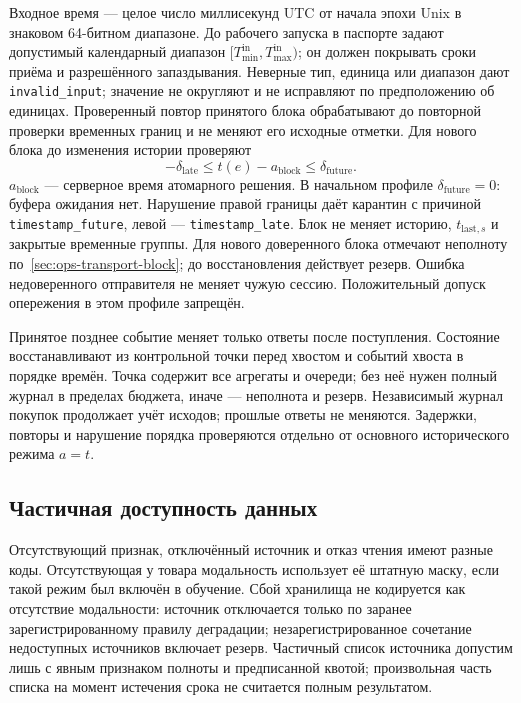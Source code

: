 \documentclass[12pt,a4paper]{article}
\newcommand{\code}[1]{{\ttfamily\small\nolinkurl{#1}}}
\theoremstyle{plainru}
\begin{document}
Входное время --- целое число миллисекунд UTC от начала эпохи Unix
в знаковом 64-битном диапазоне. До рабочего запуска в паспорте задают
допустимый календарный диапазон $[T_{\min}^{\mathrm{in}},T_{\max}^{\mathrm{in}})$;
он должен покрывать сроки приёма и разрешённого запаздывания.
Неверные тип, единица или диапазон дают \code{invalid_input};
значение не округляют и не исправляют по предположению об единицах.
Проверенный повтор принятого блока обрабатывают до повторной проверки
временных границ и не меняют его исходные отметки.
Для нового блока до изменения истории проверяют
\begin{equation}\label{eq:ops-event-time-window}
-\delta_{\mathrm{late}}\le t(e)-a_{\mathrm{block}}
\le\delta_{\mathrm{future}}.
\end{equation}
$a_{\mathrm{block}}$ --- серверное время атомарного решения.
В начальном профиле $\delta_{\mathrm{future}}=0$: буфера ожидания нет.
Нарушение правой границы даёт карантин с причиной \code{timestamp_future},
левой --- \code{timestamp_late}. Блок не меняет историю,
$t_{\mathrm{last},s}$ и закрытые временные группы. Для нового доверенного
блока отмечают неполноту по~\ref{sec:ops-transport-block};
до восстановления действует резерв. Ошибка недоверенного отправителя
не меняет чужую сессию. Положительный допуск опережения в этом профиле запрещён.

Принятое позднее событие меняет только ответы после поступления.
Состояние восстанавливают из контрольной точки перед хвостом
и событий хвоста в порядке времён. Точка содержит все агрегаты и очереди;
без неё нужен полный журнал в пределах бюджета, иначе --- неполнота и резерв.
Независимый журнал покупок продолжает учёт исходов; прошлые ответы не меняются.
Задержки, повторы и нарушение порядка проверяются отдельно
от основного исторического режима \(a=t\).

\subsection{Частичная доступность данных}\label{sec:ops-partial-data}

Отсутствующий признак, отключённый источник и отказ чтения имеют
разные коды. Отсутствующая у товара модальность использует её штатную
маску, если такой режим был включён в обучение. Сбой хранилища
не кодируется как отсутствие модальности: источник отключается только
по заранее зарегистрированному правилу деградации; незарегистрированное
сочетание недоступных источников включает резерв. Частичный список
источника допустим лишь с явным признаком полноты и предписанной квотой;
произвольная часть списка на момент истечения срока не считается полным результатом.
\end{document}
